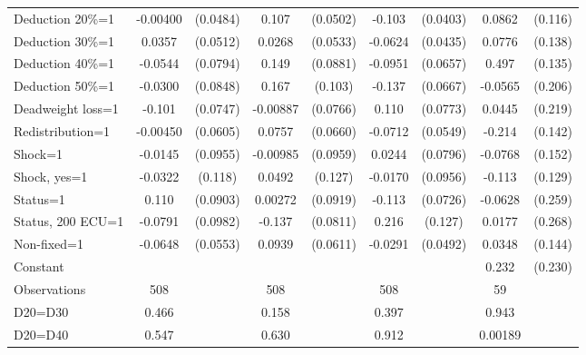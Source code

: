 \begin{tabular}{l|cccccc|cc}
Deduction 20\%=1& -0.00400         & (0.0484)&    0.107\sym{**} & (0.0502)&   -0.103\sym{**} & (0.0403)&   0.0862         &  (0.116)\\
Deduction 30\%=1&   0.0357         & (0.0512)&   0.0268         & (0.0533)&  -0.0624         & (0.0435)&   0.0776         &  (0.138)\\
Deduction 40\%=1&  -0.0544         & (0.0794)&    0.149\sym{*}  & (0.0881)&  -0.0951         & (0.0657)&    0.497\sym{***}&  (0.135)\\
Deduction 50\%=1&  -0.0300         & (0.0848)&    0.167         &  (0.103)&   -0.137\sym{**} & (0.0667)&  -0.0565         &  (0.206)\\
Deadweight loss=1&   -0.101         & (0.0747)& -0.00887         & (0.0766)&    0.110         & (0.0773)&   0.0445         &  (0.219)\\
Redistribution=1& -0.00450         & (0.0605)&   0.0757         & (0.0660)&  -0.0712         & (0.0549)&   -0.214         &  (0.142)\\
Shock=1         &  -0.0145         & (0.0955)& -0.00985         & (0.0959)&   0.0244         & (0.0796)&  -0.0768         &  (0.152)\\
Shock, yes=1    &  -0.0322         &  (0.118)&   0.0492         &  (0.127)&  -0.0170         & (0.0956)&   -0.113         &  (0.129)\\
Status=1        &    0.110         & (0.0903)&  0.00272         & (0.0919)&   -0.113         & (0.0726)&  -0.0628         &  (0.259)\\
Status, 200 ECU=1&  -0.0791         & (0.0982)&   -0.137\sym{*}  & (0.0811)&    0.216\sym{*}  &  (0.127)&   0.0177         &  (0.268)\\
Non-fixed=1     &  -0.0648         & (0.0553)&   0.0939         & (0.0611)&  -0.0291         & (0.0492)&   0.0348         &  (0.144)\\
Constant        &                  &         &                  &         &                  &         &    0.232         &  (0.230)\\
\hline
Observations    &      508         &         &      508         &         &      508         &         &       59         &         \\
D20=D30         &    0.466         &         &    0.158         &         &    0.397         &         &    0.943         &         \\
D20=D40         &    0.547         &         &    0.630         &         &    0.912         &         &  0.00189         &         \\

\end{tabular}
